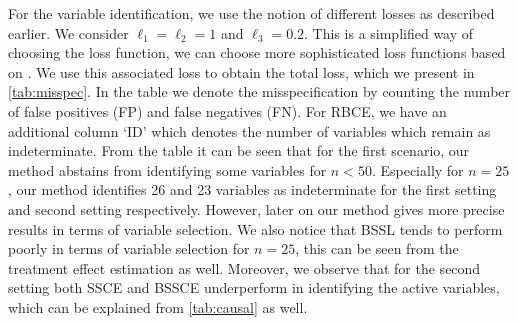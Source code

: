 \documentclass[preprint,12pt]{elsarticle}
\begin{document}
For the variable identification, we use the notion of
different losses as described earlier. We consider
$\ell_1=\ell_2 = 1$ and $\ell_3= 0.2$. This is a
simplified way of choosing the loss function, we can choose more 
sophisticated loss functions based on \cite{ZAFFALON20121282}. We use this associated loss
to obtain the total loss, which we present in \cref{tab:misspec}.
In the table we denote the misspecification by counting the number of
false positives (FP) and false negatives (FN). For RBCE, we have an
additional column `ID' which denotes the number of variables which remain as
indeterminate.
From the table it can be seen that for the first scenario, our method
abstains from identifying some variables for 
$n <50$. Especially for $n=25$, our method identifies 26 and 23 variables as indeterminate
for the first setting and second setting respectively. However,
later on our method gives more precise results in terms of variable
selection. We also notice that BSSL tends to perform poorly
in terms of variable selection for $n=25$, this can be seen
from the treatment effect estimation as well.
Moreover, we observe that for the second setting both SSCE
and BSSCE underperform in identifying the active variables, which can 
be explained from \cref{tab:causal} as well. 
\end{document}
